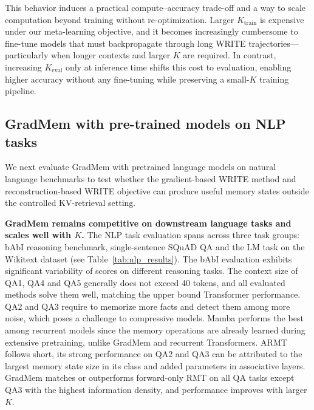 \documentclass{article}
\theoremstyle{plain}
\theoremstyle{definition}
\theoremstyle{remark}
\begin{document}
{This behavior induces a practical compute--accuracy trade-off and a way to scale computation beyond training without re-optimization. Larger $K_{\text{train}}$ is expensive under our meta-learning objective, and it becomes increasingly cumbersome to fine-tune models that must backpropagate through long WRITE trajectories---particularly when longer contexts and larger $K$ are required. In contrast, increasing $K_{\text{eval}}$ only at inference time shifts this cost to evaluation, enabling higher accuracy without any fine-tuning while preserving a small-$K$ training pipeline.





\subsection{GradMem with pre-trained models on NLP tasks}
We next evaluate GradMem with pretrained language models on natural language benchmarks to test whether the gradient-based WRITE method and reconstruction-based WRITE objective can produce useful memory states outside the controlled KV-retrieval setting. %

\textbf{GradMem remains competitive on downstream language tasks and scales well with $K$.}
The NLP task evaluation spans across three task groups: bAbI reasoning benchmark, single-sentence SQuAD QA and the LM task on the Wikitext dataset (see Table~\ref{tab:nlp_results}). 
The bAbI evaluation exhibits significant variability of scores on different reasoning tasks. The context size of QA1, QA4 and QA5 generally does not exceed 40 tokens, and all evaluated methods solve them well, matching the upper bound Transformer performance. QA2 and QA3 require to memorize more facts and detect them among more noise, which poses a challenge to compressive models. Mamba performs the best among recurrent models since the memory operations are already learned during extensive pretraining, unlike GradMem and recurrent Transformers. ARMT follows short, its strong performance on QA2 and QA3 can be attributed to the largest memory state size in its class and added parameters in associative layers. GradMem matches or outperforms forward-only RMT on all QA tasks except QA3 with the highest information density, and performance improves with larger $K$.

}
\end{document}
